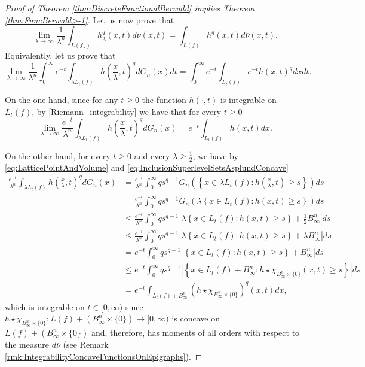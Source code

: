 \documentclass{amsart}
\theoremstyle{remark}
\theoremstyle{definition}
\numberwithin{equation}{section}
\begin{document}
\begin{proof}[Proof of Theorem \ref{thm:DiscreteFunctionalBerwald} implies Theorem \ref{thm:FuncBerwald>-1}]
Let us now prove that
\begin{equation}\label{eq:equalityexponentNew}
\lim_{\lambda \to \infty} \frac{1}{\lambda^n} \int_{L(f_\lambda)}h_\lambda^q(x,t) d\nu(x,t)=\int_{L(f)} h^q(x,t)d\overline{\nu}(x,t).
\end{equation}
Equivalently, let us prove that
\begin{equation}\label{equality_exponent_q}
\lim_{\lambda \to \infty} \frac{1}{\lambda^n} \int_0^{\infty} e^{-t} \int_{\lambda L_t(f)} h\left(\frac{x}{\lambda},t \right)^q dG_n(x) dt = \int_0^\infty e^{-t}\int_{L_t(f)} e^{-t} h(x,t)^q dxdt.
\end{equation}


On the one hand, since for any $t\geq0$ the function $h(\cdot, t)$ is integrable on $L_t(f)$, by \eqref{Riemann_integrability} we have that for every $t\geq0$
$$
\lim_{\lambda \to \infty} \frac{e^{-t}}{\lambda^n}  \int_{\lambda L_t(f)} h\left(\frac{x}{\lambda},t \right)^q dG_n(x) =e^{-t} \int_{L_t(f)} h(x,t) dx.
$$

On the other hand,  for every $t\geq0$ and every $\lambda\geq\frac{1}{2}$, we have by \eqref{eq:LatticePointAndVolume} and \eqref{eq:InclusionSuperlevelSetsAsplundConcave}
\begin{align*}
\frac{e^{-t}}{\lambda^n}  \int_{\lambda L_t(f)} h\left(\frac{x}{\lambda},t \right)^q dG_n(x) &= \frac{e^{-t}}{\lambda^n} \int_0^{\infty} q s^{q-1} G_n\left(\left\{ x \in \lambda L_t(f) : h\left(\frac{x}{\lambda},t \right) \geq s \right\}\right) ds \\
&= \frac{e^{-t}}{\lambda^n} \int_0^{\infty} q s^{q-1} G_n\left( \lambda \left\{ x \in L_t(f) : h\left(x,t \right) \geq s \right\}\right) ds \\
& \leq  \frac{e^{-t}}{\lambda^n} \int_0^{\infty} q s^{q-1} \left| \lambda \left\{ x \in L_t(f) : h\left(x,t \right) \geq s \right\} + \frac{1}{2} B_{\infty}^n \right| ds\\
& \leq  \frac{e^{-t}}{\lambda^n} \int_0^{\infty} q s^{q-1} \left| \lambda \left\{ x \in L_t(f) : h\left(x,t \right) \geq s \right\} + \lambda B_{\infty}^n \right| ds \\
&= e^{-t} \int_0^{\infty} q s^{q-1} \left|  \left\{ x \in L_t(f) : h\left(x,t \right) \geq s \right\} + B_{\infty}^n \right| ds \\
& \leq e^{-t} \int_0^{\infty} q s^{q-1} \left|  \left\{ x \in L_t(f)+B_\infty^n : h\star\chi_{B_\infty^n\times\{0\}}(x,t) \geq s \right\}  \right| ds \\
&=e^{-t}\int_{L_t(f)+B_\infty^n}(h\star\chi_{B_\infty^n\times\{0\}})^q(x,t) dx,
\end{align*}
which is integrable on $t \in [0, \infty)$ since $h\star\chi_{B_\infty^n\times\{0\}}:L(f)+(B_\infty^n\times\{0\})\to[0,\infty)$ is concave on $L(f)+(B_\infty^n\times\{0\})$ and, therefore, has moments of all orders with respect to the measure $d\overline{\nu}$ (see Remark \ref{rmk:IntegrabilityConcaveFunctionsOnEpigraphs}).



\end{proof}
\end{document}
